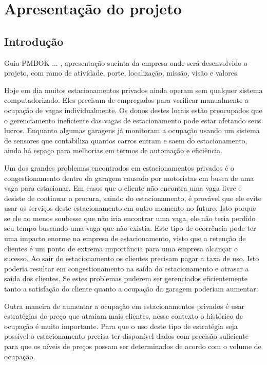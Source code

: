 \part{Apresentação do projeto}

\chapter[Introdução]{Introdução}

Guia PMBOK ... \cite{project2013guia}, apresentação sucinta da empresa onde será desenvolvido o projeto, com ramo de atividade, porte, localização, missão, visão e valores.

Hoje em dia muitos estacionamentos privados ainda operam sem qualquer sistema computadorizado. Eles precisam de empregados para verificar manualmente a ocupação de vagas individualmente. Os donos destes locais estão preocupados que o gerenciamento ineficiente das vagas de estacionamento pode estar afetando seus lucros. Enquanto algumas garagens já monitoram a ocupação usando um sistema de sensores que contabiliza quantos carros entram e saem do estacionamento, ainda há espaço para melhorias em termos de automação e eficiência.

Um dos grandes problemas encontrados em estacionamentos privados é o congestionamento dentro da garagem causado por motoristas em busca de uma vaga para estacionar. Em casos que o cliente não encontra uma vaga livre e desiste de continuar a procura, saindo do estacionamento, é provável que ele evite usar os serviços deste estacionamento em outro momento no futuro. Isto porque se ele ao menos soubesse que não iria encontrar uma vaga, ele não teria perdido seu tempo buscando uma vaga que não existia. Este tipo de ocorrência pode ter uma impacto enorme na empresa de estacionamento, visto que a retenção de clientes é um ponto de extrema importância para uma empresa alcançar o sucesso. Ao sair do estacionamento os clientes precisam pagar a taxa de uso. Isto poderia resultar em congestionamento na saída do estacionamento e atrasar a saída dos clientes. Se estes problemas puderem ser gerenciados eficientemente tanto a satisfação do cliente quanto a ocupação da garagem poderiam aumentar.

Outra maneira de aumentar a ocupação em estacionamentos privados é usar estratégias de preço que atraiam mais clientes, nesse contexto o histórico de ocupação é muito importante. Para que o uso deste tipo de estratégia seja possível o estacionamento precisa ter disponível dados com precisão suficiente para que os níveis de preços possam ser determinados de acordo com o volume de ocupação.

